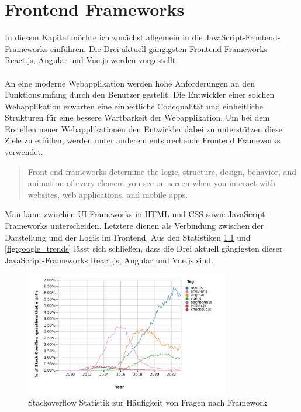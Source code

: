 %

\chapter{Frontend Frameworks}

In diesem Kapitel möchte ich zunächst allgemein in die JavaScript-Frontend-Frameworks einführen.
Die Drei aktuell gängigsten Frontend-Frameworks React.js, Angular und Vue.js werden vorgestellt.
\\
\\
An eine moderne Webapplikation werden hohe Anforderungen an den Funktionsumfang durch den Benutzer gestellt.
Die Entwickler einer solchen Webapplikation erwarten eine einheitliche Codequalität und einheitliche Strukturen
für eine bessere Wartbarkeit der Webapplikation.
Um bei dem Erstellen neuer Webapplikationen den Entwickler dabei zu unterstützen diese Ziele zu erfüllen,
werden unter anderem entsprechende Frontend Frameworks verwendet.
\begin{quote}
    Front-end frameworks determine the logic, structure, design, behavior,
    and animation of every element you see on-screen when you interact with websites,
    web applications, and mobile apps. \cite{sigdestad22}
\end{quote}
Man kann zwischen UI-Frameworks in HTML und CSS sowie JavaScript-Frameworks unterscheiden.
Letztere dienen als Verbindung zwischen der Darstellung und der Logik im Frontend.
Aus den Statistiken \ref{fig:stackoverflow_stat} und \ref{fig:google_trends} lässt sich schließen,
dass die Drei aktuell gängigsten dieser JavaScript-Frameworks React.js, Angular und Vue.js sind.


\begin{figure}[!htb]
    \centering
    \includegraphics[width=0.8\textwidth]{img/js_frameworks_statistic_stackoverflow}
    \caption{Stackoverflow Statistik zur Häufigkeit von Fragen nach Framework \cite{stackoverflowStats}}
    \label{fig:stackoverflow_stat}
\end{figure}

